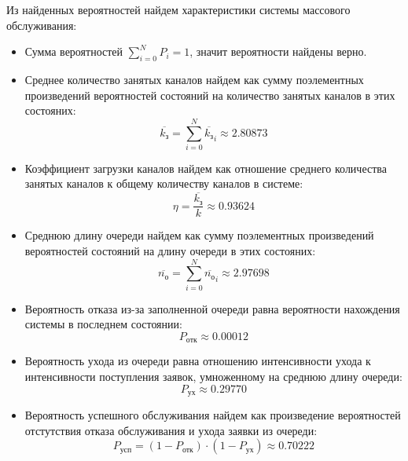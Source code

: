 Из найденных вероятностей найдем характеристики системы массового обслуживания:
\begin{itemize}
	\item Сумма вероятностей $\sum\limits_{i=0}^{N} P_i = 1$, значит вероятности найдены верно.
	
	\item Среднее количество занятых каналов найдем как сумму поэлементных произведений вероятностей состояний на количество занятых каналов в этих состояних: 
	\begin{displaymath}
		\overline{k_\text{з}} = \sum \limits_{i=0}^{N} \overline{k_\text{з}}_i \approx 2.80873
	\end{displaymath}
	
	\item Коэффициент загрузки каналов найдем как отношение среднего количества занятых каналов к общему количеству каналов в системе:
	\begin{displaymath}
		\eta = \dfrac{\overline{k_\text{з}}}{k} \approx 0.93624
	\end{displaymath}
	
	\item Среднюю длину очереди найдем как сумму поэлементных произведений вероятностей состояний на длину очереди в этих состояних: 
	\begin{displaymath}
		\overline{n_\text{о}} = \sum \limits_{i=0}^{N} \overline{n_\text{о}}_i \approx 2.97698
	\end{displaymath}
	
	\item Вероятность отказа из-за заполненной очереди равна вероятности нахождения системы в последнем состоянии: 
	\begin{displaymath}
		P_\text{отк} \approx 0.00012
	\end{displaymath}
	
	\item Вероятность ухода из очереди равна отношению интенсивности ухода к интенсивности поступления заявок, умноженному на среднюю длину очереди: 
	\begin{displaymath}
		P_\text{ух} \approx 0.29770
	\end{displaymath}
	
	\item Вероятность успешного обслуживания найдем как произведение вероятностей отстутствия отказа обслуживания и ухода заявки из очереди: 
	\begin{displaymath}
		P_\text{усп} = (1 - P_\text{отк}) \cdot (1 - P_\text{ух}) \approx 0.70222
	\end{displaymath}
	

\end{itemize}
